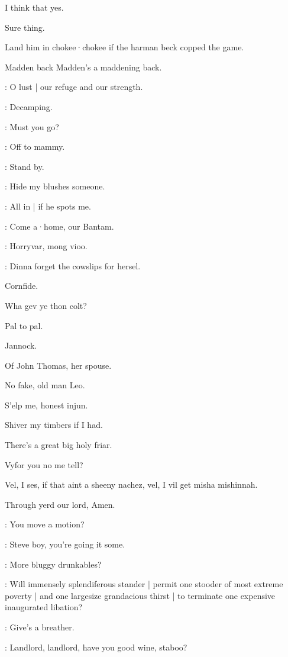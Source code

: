 I think that yes.

Sure thing.

Land him in chokee·chokee if the harman beck copped the game.

Madden back Madden's a maddening back.

\lynch:
O lust |
our refuge and our strength.

\madden:
Decamping.

\bannon:
Must you go?

\madden:
Off to mammy.

\dixon:
Stand by.

\madden:
Hide my blushes someone.


\Bloom:
All in |
if he spots me.

\punch:
Come a·home,
our Bantam.

\dixon:
Horryvar,
mong vioo.

\crotthers:
Dinna forget the cowslips for hersel.

Cornfide.

Wha gev ye thon colt?

Pal to pal.

Jannock.

Of John Thomas,
her spouse.

No fake,
old man Leo.

S'elp me,
honest injun.

Shiver my timbers if I had.

There's a great big holy friar.

Vyfor you no me tell?

Vel,
I ses,
if that aint a sheeny nachez,
vel,
I vil get misha mishinnah.

Through yerd our lord,
Amen.


\stephen:
You move a motion?

\lenehan:
Steve boy,
you're going it some.

\dixon:
More bluggy drunkables?

\lynch:
Will immensely splendiferous stander |
permit one stooder of most extreme poverty |
and one largesize grandacious thirst |
to terminate one expensive inaugurated libation?

\crotthers:
Give's a breather.

\punch:
Landlord,
landlord,
have you good wine,
staboo?

